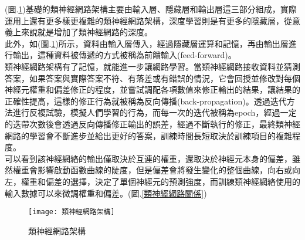  (圖.\ref{類神經網路架構})基礎的類神經網路架構主要由輸入層、隱藏層和輸出層這三部分組成，實際運用上還有更多樣更複雜的類神經網路架構，深度學習則是有更多的隱藏層，從意義上來說就是增加了類神經網路的深度。\\

 此外，如(圖.\ref{類神經網路架構})所示，資料由輸入層傳入，經過隱藏層運算和記憶，再由輸出層進行輸出，這種資料被傳遞的方式被稱為前饋輸入(feed-forward)。\\

 類神經網路架構有了記憶，就能進一步讓網路學習。當類神經網路接收資料並猜測答案，如果答案與實際答案不符、有落差或有錯誤的情況，它會回授並修改對每個神經元權重和偏差修正的程度，並嘗試調配各項數值來修正輸出的結果，讓結果的正確性提高，這樣的修正行為就被稱為反向傳播(back-propagation)。透過迭代方法進行反複試驗，模擬人們學習的行為，而每一次的迭代被稱為epoch，經過一定的迭帶次數後會透過反向傳播修正輸出的誤差，經過不斷執行的修正，最終類神經網路的學習會不斷進步並給出更好的答案，訓練時間長短取決於訓練項目的複雜程度。\\

 可以看到該神經網絡的輸出僅取決於互連的權重，還取決於神經元本身的偏差，雖然權重會影響啟動函數曲線的陡度，但是偏差會將發生變化的整個曲線，向右或向左，權重和偏差的選擇，決定了單個神經元的預測強度，而訓練類神經網絡使用的輸入數據可以來微調權重和偏差。(圖.\ref{類神經網路關係})\\

\newpage
\begin{figure}
\begin{center}
\texttt{[image: 類神經網路架構]}
\caption{\Large 類神經網路架構}
\label{類神經網路架構}
\end{center}
\end{figure}


